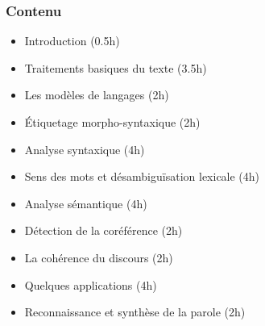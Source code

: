 \documentclass{beamer}
\begin{document}
\begin{frame}
\frametitle{Contenu }

\begin{itemize}
	\item Introduction (0.5h)
	\item Traitements basiques du texte (3.5h)
	\item Les modèles de langages (2h)
	\item Étiquetage morpho-syntaxique (2h)
	\item Analyse syntaxique (4h)
	\item Sens des mots et désambiguïsation lexicale (4h)
	\item Analyse sémantique (4h)
	\item Détection de la coréférence (2h)
	\item La cohérence du discours (2h)
	\item \color{red} Quelques applications (4h)
	\item \color{red} Reconnaissance et synthèse de la parole (2h)
\end{itemize}

\end{frame}
\end{document}
